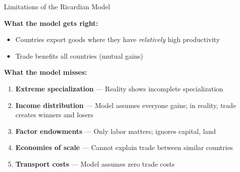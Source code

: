 \documentclass{beamer}
\begin{document}
\begin{frame}{Limitations of the Ricardian Model}

\textbf{What the model gets right:}
\begin{itemize}
    \item Countries export goods where they have \textit{relatively} high productivity
    \item Trade benefits all countries (mutual gains)
\end{itemize}

\vspace{0.5cm}

\textbf{What the model misses:}
\begin{enumerate}
    \item \textbf{Extreme specialization} --- Reality shows incomplete specialization
    \item \textbf{Income distribution} --- Model assumes everyone gains; in reality, trade creates winners and losers
    \item \textbf{Factor endowments} --- Only labor matters; ignores capital, land
    \item \textbf{Economies of scale} --- Cannot explain trade between similar countries
    \item \textbf{Transport costs} --- Model assumes zero trade costs
\end{enumerate}
\end{frame}

\end{document}
